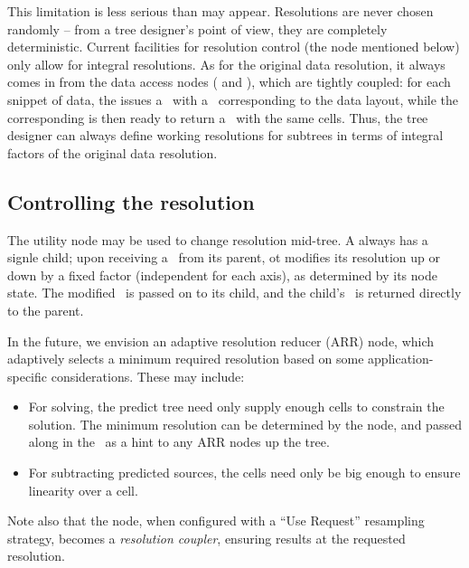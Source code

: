   This limitation is less serious than may appear. Resolutions are never chosen
  randomly -- from a tree designer's point of view, they are completely
  deterministic. Current facilities for resolution control (the 
  node mentioned below) only allow for integral resolutions. As for the
  original data resolution, it always comes in from the data access nodes
  ( and ), which are tightly coupled: for each snippet of
  data, the  issues a \Request\ with a \Cells\ corresponding to the
  data layout, while the corresponding  is then ready to return a
  \Result\ with the same cells. Thus, the tree designer can always define
  working resolutions for subtrees in terms of integral factors of the original
  data resolution.

\subsection{Controlling the resolution}

  The  utility node may be used to change resolution mid-tree. A
   always has a signle child; upon receiving a \Request\ from its
  parent, ot modifies its resolution up or down by a fixed factor (independent
  for each axis), as determined by its node state. The modified \Request\ is
  passed on to its child, and the child's \Result\ is returned directly to the
  parent.

  In the future, we envision an adaptive resolution reducer (ARR) node, which
  adaptively selects a minimum required resolution based on some
  application-specific considerations. These may include:

  \begin{itemize}
  
  \item For solving, the predict tree need only supply enough cells to
  constrain the solution. The minimum resolution can be determined by the
   node, and passed along in the \Request\ as a hint to any ARR nodes
  up the tree.
  
  \item For subtracting predicted sources, the cells need only be big enough
  to ensure linearity over a cell. 
  
  \end{itemize}
  
  Note also that the  node, when configured with a ``Use Request''
  resampling strategy, becomes a {\em resolution coupler}, ensuring results at
  the requested resolution.
  
